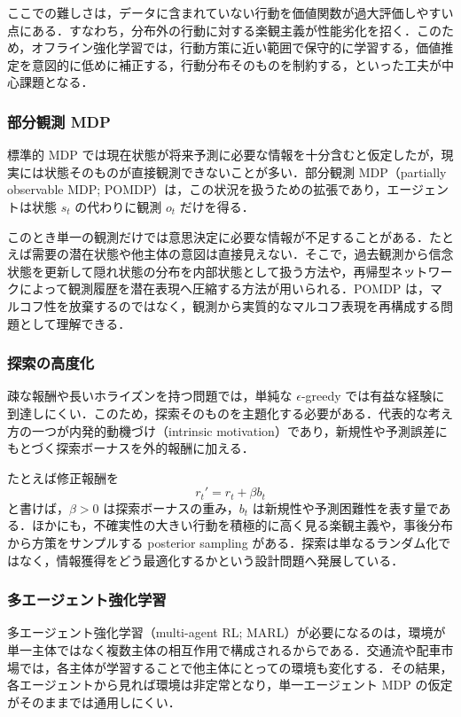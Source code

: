 ここでの難しさは，データに含まれていない行動を価値関数が過大評価しやすい点にある．すなわち，分布外の行動に対する楽観主義が性能劣化を招く．このため，オフライン強化学習では，行動方策に近い範囲で保守的に学習する，価値推定を意図的に低めに補正する，行動分布そのものを制約する，といった工夫が中心課題となる．

\subsubsection{部分観測 MDP}

標準的 MDP では現在状態が将来予測に必要な情報を十分含むと仮定したが，現実には状態そのものが直接観測できないことが多い．部分観測 MDP（partially observable MDP; POMDP）は，この状況を扱うための拡張であり，エージェントは状態 $s_t$ の代わりに観測 $o_t$ だけを得る．

このとき単一の観測だけでは意思決定に必要な情報が不足することがある．たとえば需要の潜在状態や他主体の意図は直接見えない．そこで，過去観測から信念状態を更新して隠れ状態の分布を内部状態として扱う方法や，再帰型ネットワークによって観測履歴を潜在表現へ圧縮する方法が用いられる．POMDP は，マルコフ性を放棄するのではなく，観測から実質的なマルコフ表現を再構成する問題として理解できる．

\subsubsection{探索の高度化}

疎な報酬や長いホライズンを持つ問題では，単純な $\epsilon$-greedy では有益な経験に到達しにくい．このため，探索そのものを主題化する必要がある．代表的な考え方の一つが内発的動機づけ（intrinsic motivation）であり，新規性や予測誤差にもとづく探索ボーナスを外的報酬に加える．

たとえば修正報酬を
\begin{equation*}
r_t' = r_t + \beta b_t
\end{equation*}
と書けば，$\beta > 0$ は探索ボーナスの重み，$b_t$ は新規性や予測困難性を表す量である．ほかにも，不確実性の大きい行動を積極的に高く見る楽観主義や，事後分布から方策をサンプルする posterior sampling がある．探索は単なるランダム化ではなく，情報獲得をどう最適化するかという設計問題へ発展している．

\subsubsection{多エージェント強化学習}

多エージェント強化学習（multi-agent RL; MARL）が必要になるのは，環境が単一主体ではなく複数主体の相互作用で構成されるからである．交通流や配車市場では，各主体が学習することで他主体にとっての環境も変化する．その結果，各エージェントから見れば環境は非定常となり，単一エージェント MDP の仮定がそのままでは通用しにくい．

